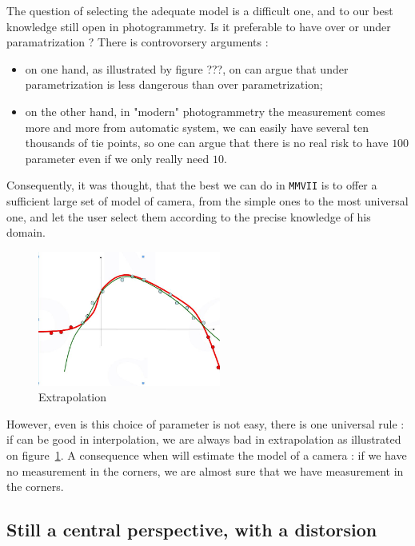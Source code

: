 The question of selecting the adequate model is a difficult one, and to our best knowledge
still open in photogrammetry.  Is it preferable to have over or under paramatrization ? There
is controvorsery arguments :


\begin{itemize}
   \item  on one hand, as illustrated by figure ???, on can argue that under parametrization is less dangerous
         than over parametrization;

   \item  on the other hand, in "modern" photogrammetry the measurement comes more and more from automatic system,
          we can easily have several ten thousands of tie points, so one can argue that there is no real risk to have $100$ parameter
          even if we only really need $10$.
\end{itemize}

Consequently, it was thought, that the best we can do in {\tt MMVII} is to offer a sufficient large set of model
of camera, from the simple ones to the most universal one, and let the user select them according to
the precise knowledge of his domain. 

\begin{figure}
\centering
	\includegraphics[width=6cm]{Methods/Images/CourbeExrapol.jpg}
	\caption{Extrapolation}
	\label{fig:CurvesExtrpol}
\end{figure}

However, even is this choice of parameter is not easy, there is
one universal rule : if can be good in interpolation, we are always bad in extrapolation
as illustrated on figure~\ref{fig:CurvesExtrpol}. A 
consequence when will estimate the model of a camera : if we have no measurement in the corners,
we are almost sure that we have measurement in the corners.

\subsection{Still a central perspective, with a distorsion}

